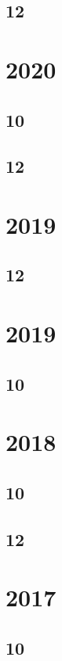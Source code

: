 \documentclass[11pt]{book}
\begin{document}
\subsection{12}

\section{2020}
\subsection{10}

\subsection{12}

\section{2019}
\subsection{12}





\section{2019}
\subsection{10}

\section{2018}
\subsection{10}

\subsection{12}




\section{2017}
\subsection{10}
\end{document}
